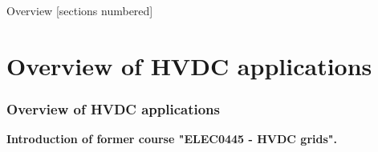 \titleframe

\begin{frame}{Overview}
  [sections numbered]
  \tableofcontents[hideallsubsections]
\end{frame}







\section{Overview of HVDC applications}

\begin{frame}[fragile]
\frametitle{Overview of HVDC applications}
\begin{center}
\textbf{Introduction of former course "ELEC0445 - HVDC grids".}
\end{center}
\end{frame}

